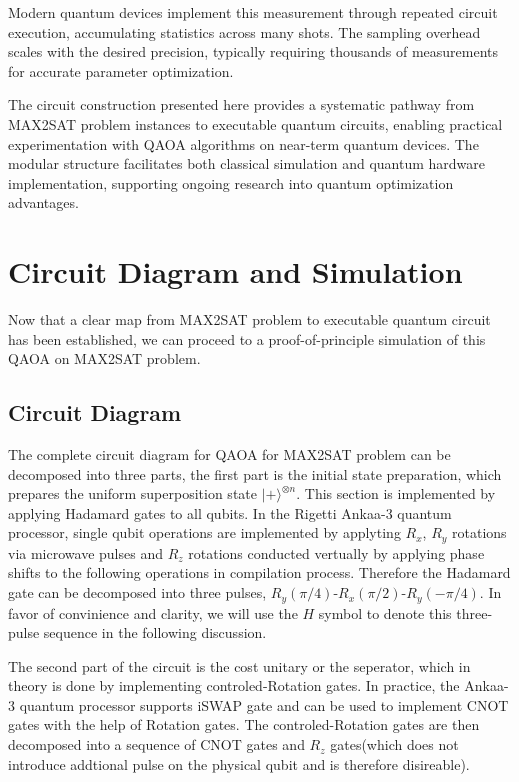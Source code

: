 \documentclass[%
 reprint,
 amsmath,amssymb,
 aps,
]{revtex4-2}
\begin{document}
Modern quantum devices implement this measurement through repeated circuit execution, accumulating statistics across many shots. The sampling overhead scales with the desired precision, typically requiring thousands of measurements for accurate parameter optimization.

The circuit construction presented here provides a systematic pathway from MAX2SAT problem instances to executable quantum circuits, enabling practical experimentation with QAOA algorithms on near-term quantum devices. The modular structure facilitates both classical simulation and quantum hardware implementation, supporting ongoing research into quantum optimization advantages.

\section{Circuit Diagram and Simulation}
\label{sec:circuit_diagram}
Now that a clear map from MAX2SAT problem to executable quantum circuit has been established, we can proceed to a proof-of-principle simulation of this QAOA on MAX2SAT problem.

\subsection{Circuit Diagram}
The complete circuit diagram for QAOA for MAX2SAT problem can be decomposed into three parts, the first part is the initial state preparation, which prepares the uniform superposition state $|+\rangle^{\otimes n}$. This section is implemented by applying Hadamard gates to all qubits. In the Rigetti Ankaa-3 quantum processor, single qubit operations are implemented by applyting $R_x$, $R_y$ rotations via microwave pulses and $R_z$ rotations conducted vertually by applying phase shifts to the following operations in compilation process. Therefore the Hadamard gate can be decomposed into three pulses, $R_y(\pi/4)$-$R_x(\pi/2)$-$R_y(-\pi/4)$. In favor of convinience and clarity, we will use the $H$ symbol to denote this three-pulse sequence in the following discussion.

The second part of the circuit is the cost unitary or the seperator, which in theory is done by implementing controled-Rotation gates. In practice, the Ankaa-3 quantum processor supports iSWAP gate and can be used to implement CNOT gates with the help of Rotation gates. The controled-Rotation gates are then decomposed into a sequence of CNOT gates and $R_z$ gates(which does not introduce addtional pulse on the physical qubit and is therefore disireable).
\end{document}
